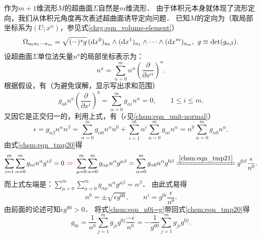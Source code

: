 作为$m+1$维流形$M$的超曲面$\Sigma$自然是$m$维流形．
由于体积元本身就体现了流形定向，我们从体积元角度再次表述超曲面诱导定向问题．
已知$M$的定向为（取局部坐标系为$(U;x^\alpha)$，参见式\eqref{chrg:eqn_volume-element}）
\begin{equation}\label{chsm:eqn_VEM}
    \Omega_{a_0 a_1 \cdots a_m}= \sqrt{(-)^s g}\, ({\rm d}x^0)_{a_0} \wedge({\rm d}x^1)_{a_1} \wedge
    \cdots \wedge({\rm d}x^m)_{a_m}, \  g\equiv \det(g_{\alpha\beta}).
\end{equation}
设超曲面$\Sigma$单位法矢量$n^a$的局部坐标表示为：
\begin{equation}
    n^a = \sum_{\alpha=0}^{m} n^\alpha \left(\frac{\partial }{\partial x^\alpha}\right)^a.
\end{equation}
根据假设，有（为避免误解，显示写出求和范围）
\begin{equation}\label{chsm:eqn_tmp20}
    g_{ab}n^a \left(\frac{\partial }{\partial x^i}\right)^b =
      \sum_{\alpha=0}^{m} g_{\alpha i}  n^\alpha =0, \qquad 1 \leqslant i \leqslant m.
\end{equation}
又因它是正交归一的，利用上式，有（$\epsilon$见\eqref{chsm:eqn_unit-normal}）
\begin{equation}\label{chsm:eqn_tmp21}
    \epsilon  = g_{\alpha\beta} n^\alpha n^\beta  %
     = \sum_{\alpha=0}^{m}g_{\alpha 0}n^\alpha n^0 + \sum_{i=1}^{m}  n^i \sum_{\alpha=0}^{m}g_{\alpha i}n^\alpha
     = n^0 \sum_{\alpha=0}^{m}g_{\alpha 0}n^\alpha  .
\end{equation}
由式\eqref{chsm:eqn_tmp20}得
\begin{equation*}
    \sum_{i=1}^{m}\sum_{\alpha=0}^{m} g_{\alpha i}  n^\alpha g^{i\beta} =0 {\ \color{red}\Rightarrow\ }
    \sum_{\mu=0}^{m}\sum_{\alpha=0}^{m} g_{\alpha \mu}  n^\alpha g^{\mu\beta}
    =\sum_{\alpha=0}^{m} g_{\alpha 0}  n^\alpha g^{0\beta}
    \xlongequal{\ref{chsm:eqn_tmp21}}
    g^{0\beta} \frac{\epsilon}{n^0} .
\end{equation*}
而上式左端是：$\sum_{\mu=0}^{m}\sum_{\alpha=0}^{m} g_{\alpha \mu}  n^\alpha g^{\mu\beta} =n^\beta$．
由此式易得
\begin{equation}\label{chsm:eqn_n0i=g}
    n^0 = \pm \sqrt{\epsilon g^{00}}, \qquad
    n^i =  g^{0i} \frac{\epsilon}{n^0} .
\end{equation}
由前面的论述可知$\epsilon g^{00}>0$．
将式\eqref{chsm:eqn_n0i=g}带回式\eqref{chsm:eqn_tmp20}得
\begin{equation}
    g_{0i} = \frac{1}{n^0} \sum_{j=1}^{m} g_{ji} g^{0j} \frac{-\epsilon}{n^0}
      = -\frac{1}{g^{00}} \sum_{j=1}^{m} g_{ji} g^{0j} .
\end{equation}
